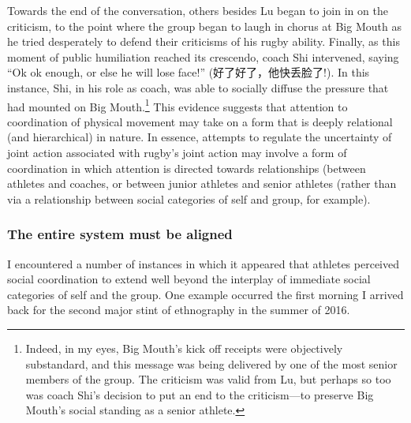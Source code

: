 \begin{CJK}{UTF8}{gbsn}
Towards the end of the conversation, others besides Lu began to join in on the criticism, to the point where the group began to laugh in chorus at Big Mouth as he tried desperately to defend their criticisms of his rugby ability.  Finally, as this moment of public humiliation reached its crescendo, coach Shi intervened, saying ``Ok ok enough, or else he will lose face!'' (好了好了，他快丢脸了!).  In this instance, Shi, in his role as coach, was able to socially diffuse the pressure that had mounted on Big Mouth.\footnote{Indeed, in my eyes, Big Mouth's kick off receipts were objectively substandard, and this message was being delivered by one of the most senior members of the group. The criticism was valid from Lu, but perhaps so too was coach Shi's decision to put an end to the criticism---to preserve Big Mouth's social standing as a senior athlete.}  This evidence suggests that attention to coordination of physical movement may take on a form that is deeply relational (and hierarchical) in nature.  In essence, attempts to regulate the uncertainty of joint action associated with rugby's joint action may involve a form of coordination in which attention is directed towards relationships (between athletes and coaches, or between junior athletes and senior athletes (rather than via a relationship between social categories of self and group, for example).






\subsubsection{The entire system must be aligned \label{sect:systemAligned}}
I encountered a number of instances in which it appeared that athletes perceived social coordination to extend well beyond the interplay of immediate social categories of self and the group.  One example occurred the first morning I arrived back for the second major stint of ethnography in the summer of 2016.


\end{CJK}
